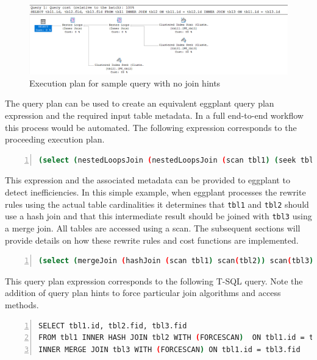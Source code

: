 \documentclass{article}
\begin{document}
\begin{figure}[H]
\centering
\begin{minipage}[b]{0.9\textwidth}
    \includegraphics[width=\textwidth]{sample_plan2.png}
    \caption{Execution plan for sample query with no join hints}
\end{minipage}
\hfill
\end{figure}

The query plan can be used to create an equivalent eggplant query plan expression and the 
required input table metadata.  In a full end-to-end workflow this process would be automated.  
The following expression corresponds to the proceeding execution plan.

\begin{lstlisting}[language=bash,
    frame=single, numbers=left, numbersep=5pt, numberstyle=\tiny\color{mygray},]
(select (nestedLoopsJoin (nestedLoopsJoin (scan tbl1) (seek tbl3)) seek(tbl2)))
\end{lstlisting}

This expression and the associated metadata can be provided to eggplant to detect inefficiencies.
In this simple example, when eggplant processes the rewrite rules using the actual table cardinalities
it determines that \texttt{tbl1} and \texttt{tbl2} should use a hash join and that this intermediate result should
be joined with \texttt{tbl3} using a merge join.  All tables are accessed using a scan.  The subsequent sections 
will provide details on how these rewrite rules and cost functions are implemented.

\begin{lstlisting}[language=bash,
    frame=single, numbers=left, numbersep=5pt, numberstyle=\tiny\color{mygray},]
(select (mergeJoin (hashJoin (scan tbl1) scan(tbl2)) scan(tbl3)))
\end{lstlisting}

This query plan expression corresponds to the following T-SQL query.  Note the addition of query plan hints to force 
particular join algorithms and access methods.

\begin{lstlisting}[language=bash,
    frame=single, numbers=left, numbersep=5pt, numberstyle=\tiny\color{mygray},]
SELECT tbl1.id, tbl2.fid, tbl3.fid
FROM tbl1 INNER HASH JOIN tbl2 WITH (FORCESCAN)  ON tbl1.id = tbl2.fid
INNER MERGE JOIN tbl3 WITH (FORCESCAN) ON tbl1.id = tbl3.fid
\end{lstlisting}
    
\end{document}
